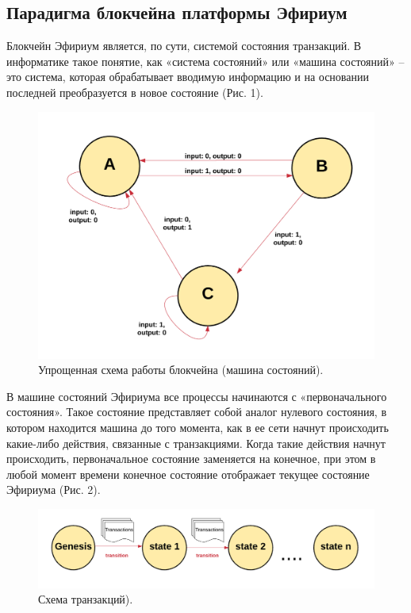 \documentclass{article}
\begin{document}
\subsection{Парадигма блокчейна платформы Эфириум}

Блокчейн Эфириум является, по сути, системой состояния транзакций. В информатике такое понятие, как «система состояний» или «машина состояний» – это система, которая обрабатывает вводимую информацию и на основании последней преобразуется в новое состояние (Рис. 1). 

\begin{figure}
    \centering
    \includegraphics[scale=0.25]{scheme_1}
    \caption{Упрощенная схема работы блокчейна (машина состояний).}
    \label{fig:scheme_1}
\end{figure}

В машине состояний Эфириума все процессы начинаются с «первоначального состояния». Такое состояние представляет собой аналог нулевого состояния, в котором находится машина до того момента, как в ее сети начнут происходить какие-либо действия, связанные с транзакциями. Когда такие действия начнут происходить, первоначальное состояние заменяется на конечное, при этом в любой момент времени конечное состояние отображает текущее состояние Эфириума (Рис. 2).


\begin{figure}
    \centering
    \includegraphics[scale=0.3]{scheme_2}
    \caption{Схема транзакций).}
    \label{fig:scheme_2}
\end{figure}
\end{document}
